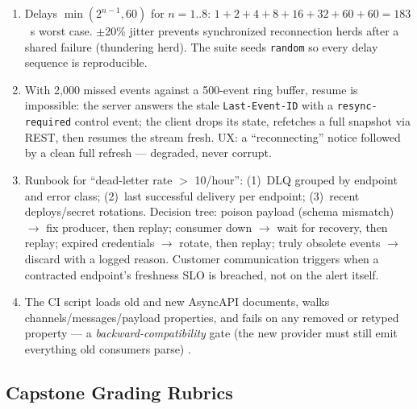\begin{enumerate}[label=\textbf{E11.\arabic*.}, leftmargin=2.8em]
    attacker-controlled bytes from confusing intermediaries.
  \item Delays $\min(2^{n-1}, 60)$ for $n=1..8$: $1+2+4+8+16+32+60+60 =
    183$~s worst case. $\pm$20\% jitter prevents synchronized reconnection
    herds after a shared failure (thundering herd). The suite seeds
    \texttt{random} so every delay sequence is reproducible.
  \item With 2{,}000 missed events against a 500-event ring buffer, resume
    is impossible: the server answers the stale \texttt{Last-Event-ID} with
    a \texttt{resync-required} control event; the client drops its state,
    refetches a full snapshot via REST, then resumes the stream fresh. UX:
    a ``reconnecting'' notice followed by a clean full refresh --- degraded,
    never corrupt.
  \item Runbook for ``dead-letter rate $>$ 10/hour'': (1)~DLQ grouped by
    endpoint and error class; (2)~last successful delivery per endpoint;
    (3)~recent deploys/secret rotations. Decision tree: poison payload
    (schema mismatch) $\to$ fix producer, then replay; consumer down $\to$
    wait for recovery, then replay; expired credentials $\to$ rotate, then
    replay; truly obsolete events $\to$ discard with a logged reason.
    Customer communication triggers when a contracted endpoint's freshness
    SLO is breached, not on the alert itself.
  \item The CI script loads old and new AsyncAPI documents, walks
    channels/messages/payload properties, and fails on any removed or
    retyped property --- a \emph{backward-compatibility} gate (the new
    provider must still emit everything old consumers parse)
    \cite{asyncapi}.
\end{enumerate}

\subsection{Capstone Grading Rubrics}

